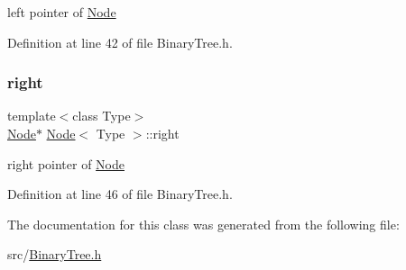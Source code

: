 left pointer of \hyperlink{class_node}{Node} 

Definition at line 42 of file Binary\+Tree.\+h.

\mbox{\label{class_node_a34452c0684d3cb1590406ad201b43e65}} 
\subsubsection{\texorpdfstring{right}{right}}
{\footnotesize\ttfamily template$<$class Type$>$ \\
\hyperlink{class_node}{Node}$\ast$ \hyperlink{class_node}{Node}$<$ Type $>$\+::right}

right pointer of \hyperlink{class_node}{Node} 

Definition at line 46 of file Binary\+Tree.\+h.



The documentation for this class was generated from the following file\+:\begin{DoxyCompactItemize}
\item 
src/\hyperlink{_binary_tree_8h}{Binary\+Tree.\+h}\end{DoxyCompactItemize}
